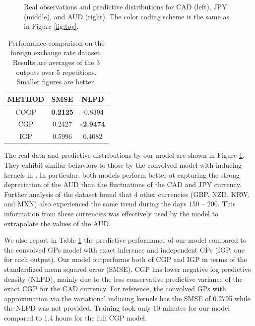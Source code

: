\begin{figure}
\begin{tabular}{ccc}
\end{tabular}
\caption{Real observations and predictive distributions for CAD (left), JPY (middle), and AUD (right). The color coding scheme is the same as in Figure \ref{fig:toy}.}
\label{fig:fx}
\end{figure}

\setlength{\tabcolsep}{4pt}
\begin{table}[t]
\caption{Performance comparison on the foreign exchange rate dataset. Results are averages of the 3 outputs over 5 repetitions. Smaller figures are better.}
\label{tab:fx}
\begin{center}
\begin{tabular}{ccc}
\toprule
\textbf{METHOD} & \textbf{SMSE} & \textbf{NLPD} \\ \hline
COGP  & \textbf{0.2125} & -0.8394 \\
CGP & 0.2427 & \textbf{-2.9474} \\
IGP & 0.5996 & 0.4082 \\
\bottomrule
\end{tabular}
\end{center}
\end{table}

The real data and predictive distributions by our model are shown in Figure \ref{fig:fx}.
They exhibit similar behaviors to those by the convolved model with inducing kernels in \citet{alvarez2010efficient}.
In particular, both models perform better at capturing the strong depreciation of the AUD than the fluctuations of the CAD and JPY currency.
Further analysis of the dataset found that 4 other currencies (GBP, NZD, KRW, and MXN) also experienced the same trend during the days 
150 -- 200.
This information from these currencies was effectively used by the model to extrapolate the values of the AUD.

We also report in Table \ref{tab:fx} the predictive performance of our model compared to the convolved GPs model with exact inference \citep[CGP,][]{alvarez-lawrence-nips-08} and independent GPs (IGP, one for each output).
Our model outperforms both of CGP and IGP in terms of the standardized mean squared error (SMSE).
CGP has lower negative log predictive density (NLPD), mainly due to the less conservative predictive variance of the exact CGP for the CAD currency.
For reference, the convolved GPs with approximation via the variational inducing kernels  \citep[CGPVAR,][]{alvarez2010efficient} has the SMSE of 0.2795 while the NLPD was not provided.
Training took only 10 minutes for our model compared to 1.4 hours for the full CGP model.

